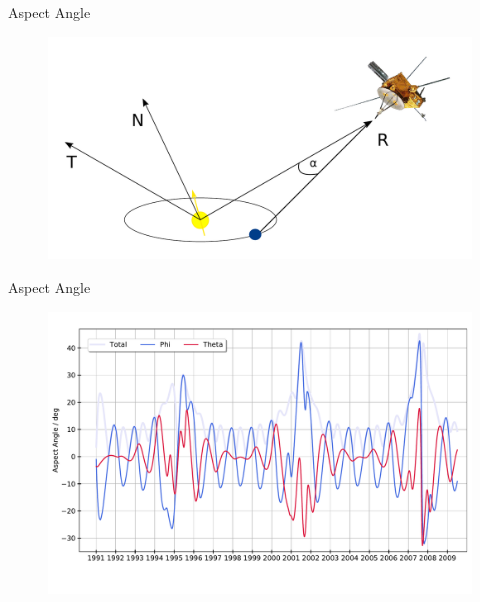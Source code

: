 \documentclass{beamer}
\begin{document}




\begin{frame}{Aspect Angle}
\begin{figure}
	\includegraphics[scale=0.45]{Pics/RTN_AA_flat_angle.pdf}
\end{figure}
\end{frame}


\begin{frame}{Aspect Angle}
\begin{figure}
	\includegraphics[scale=0.37]{Pics/aa_new.pdf}
\end{figure}
\end{frame}

\end{document}

